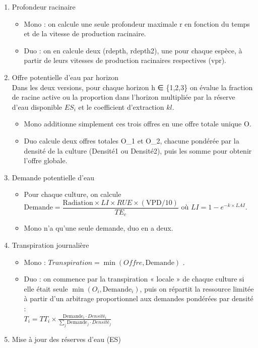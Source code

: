 \documentclass[
]{article}
\begin{document}
\begin{enumerate}
\def\labelenumi{\arabic{enumi}.}
\item
  Profondeur racinaire

  \begin{itemize}
  \item
    Mono : on calcule une seule profondeur maximale r en fonction du
    temps et de la vitesse de production racinaire.
  \item
    Duo : on en calcule deux (rdepth, rdepth2), une pour chaque espèce,
    à partir de leurs vitesses de production racinaires respectives
    (vpr).
  \end{itemize}
\item
  Offre potentielle d'eau par horizon\\
  Dans les deux versions, pour chaque horizon h ∈ \{1,2,3\} on évalue la
  fraction de racine active ou la proportion dans l'horizon multipliée
  par la réserve d'eau disponible \(ES_i\) et le coefficient
  d'extraction \(kl\).

  \begin{itemize}
  \item
    Mono additionne simplement ces trois offres en une offre totale
    unique O.
  \item
    Duo calcule deux offres totales O\_1 et O\_2, chacune pondérée par
    la densité de la culture (Densité1 ou Densité2), puis les somme pour
    obtenir l'offre globale.
  \end{itemize}
\item
  Demande potentielle d'eau

  \begin{itemize}
  \item
    Pour chaque culture, on calcule
    \(\text{Demande} = \dfrac{\text{Radiation}\times LI\times RUE \times (\text{VPD}/10)}{TE_c}\)
    où \(LI=1-e^{-k\times LAI}.\)
  \item
    Mono n'a qu'une seule demande, duo en a deux.
  \end{itemize}
\item
  Transpiration journalière

  \begin{itemize}
  \item
    Mono : \(Transpiration =\min(Offre, \text{Demande})\) .
  \item
    Duo : on commence par la transpiration « locale » de chaque culture
    si elle était seule \(\min(O_i, \text{Demande}_i)\), puis on
    répartit la ressource limitée à partir d'un arbitrage proportionnel
    aux demandes pondérées par densité :\\
    \(T_i = TT_i \times \frac{\text{Demande}_i\cdot Densité_i} {\sum_j \text{Demande}_j\cdot Densité_j}\)
  \end{itemize}
\item
  Mise à jour des réserves d'eau (ES)


\end{enumerate}
\end{document}
